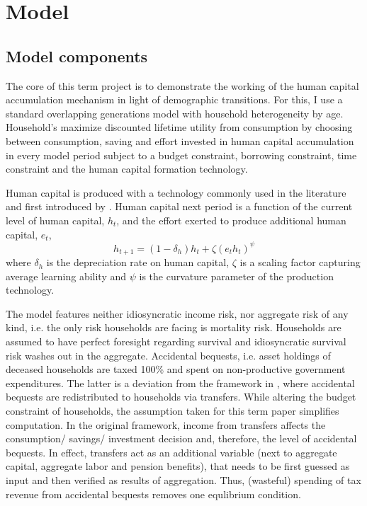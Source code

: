 \section{Model}
\label{sec:model}

\subsection{Model components}

The core of this term project is to demonstrate the working of the human capital accumulation mechanism in light of demographic transitions. For this, I use a standard overlapping generations model with household heterogeneity by age. Household's maximize discounted lifetime utility from consumption by choosing between consumption, saving and effort invested in human capital accumulation in every model period subject to a budget constraint, borrowing constraint, time constraint and the human capital formation technology.

Human capital is produced with a technology commonly used in the literature and first introduced by \cite{Ben-Porath1967}. Human capital next period is a function of the current level of human capital, $h_t$, and the effort exerted to produce additional human capital, $e_t$,
$$ h_{t+1} = (1-\delta_h) h_t + \zeta (e_t h_t)^\psi$$
where $\delta_h$ is the depreciation rate on human capital, $\zeta$ is a scaling factor capturing average learning ability and $\psi$ is the curvature parameter of the production technology.

The model features neither idiosyncratic income risk, nor aggregate risk of any kind, i.e. the only risk households are facing is mortality risk. Households are assumed to have perfect foresight regarding survival and idiosyncratic survival risk washes out in the aggregate. Accidental bequests, i.e. asset holdings of deceased households are taxed 100\% and spent on non-productive government expenditures. The latter is a deviation from the framework in \citet{LudwigSchelkleVogel2012}, where accidental bequests are redistributed to households via transfers. While altering the budget constraint of households, the  assumption taken for this term paper simplifies computation. In the original framework, income from transfers affects the consumption/ savings/ investment decision and, therefore, the level of accidental bequests. In effect, transfers act as an additional variable (next to aggregate capital, aggregate labor and pension benefits), that needs to be first guessed as input and then verified as results of aggregation. Thus, (wasteful) spending of tax revenue from accidental bequests removes one equlibrium condition.

